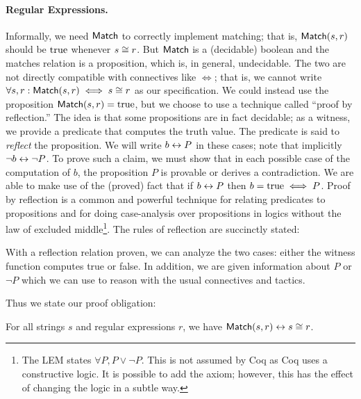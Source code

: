 \paragraph{Regular Expressions.} Informally, we need \(\mathsf{Match}\) to
correctly implement matching; that is, \(\mathsf{Match}(s, r)\) should be
\(\operatorname{true}\) whenever \(s \mathrel{\cong} r\). But \(\mathsf{Match}\) is a (decidable)
boolean and the matches relation is a proposition, which is, in general,
undecidable. The two are not directly compatible with connectives like \(\iff\);
that is, we cannot write \(\forall s, r: \mathsf{Match}(s, r) \iff s \mathrel{\cong} r\)
as our specification. We could instead use the proposition \(\mathsf{Match}(s, r)
= \operatorname{true}\), but we choose to use a technique called ``proof by reflection.'' The
idea is that some propositions are in fact decidable; as a witness, we provide a
predicate that computes the truth value. The predicate is said to \emph{reflect}
the proposition. We will write \(b \mathrel{\leftrightarrow} P\) in these cases; note that
implicitly \(\neg b \mathrel{\leftrightarrow} \neg P\). To prove such a claim, we must show that
in each possible case of the computation of \(b\), the proposition \(P\) is
provable or derives a contradiction. We are able to make use of the (proved)
fact that if \(b \mathrel{\leftrightarrow} P\) then \(b = \operatorname{true} \iff P\). Proof by reflection is
a common and powerful technique for relating predicates to propositions and for
doing case-analysis over propositions in logics without the law of excluded
middle\footnote{The LEM states \(\forall P, P \lor \neg P\). This is not assumed
by Coq as Coq uses a constructive logic. It is possible to add the axiom;
however, this has the effect of changing the logic in a subtle way.}. The rules
of reflection are succinctly stated:
With a reflection relation proven, we can analyze the two cases: either the
witness function computes true or false. In addition, we are given information
about \(P\) or \(\neg P\) which we can use to reason with the usual connectives
and tactics.

Thus we state our proof obligation:
\begin{thm}\label{Th:r_match}
    For all strings \(s\) and regular expressions \(r\), we have
    \(\mathsf{Match}(s, r) \mathrel{\leftrightarrow} s \mathrel{\cong} r\).
\end{thm}


